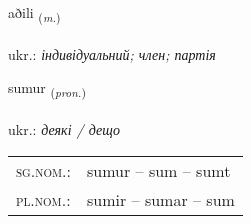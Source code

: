 \documentclass[frontgrid, backgrid]{flacards}\usepackage[]{graphicx}\usepackage[]{xcolor}
\begin{document}
\renewcommand{\blhead}{\vskip5pt {\small\bfseries\footnotesize Nafnorð | іменник }}
\renewcommand{\bcfoot}{\vskip5pt \hspace{2pt}{\small\bfseries\footnotesize 1K}}


{aðili \small{\textsubscript{(\textit{m.})}} \\[1ex] %
\textphonetic{[aːðɪlɪ]} \\
ukr.: \emph{індивідуальний; член; партія} \\  [2ex]
\renewcommand*{\arraystretch}{0.8}
}

\renewcommand{\flhead}{\vskip5pt \fboxsep=0pt {\small\bfseries\footnotesize Fornafn | займенник}}
\renewcommand{\fcfoot}{\vskip5pt \fboxsep=0pt \hspace{2pt}{\small\bfseries\footnotesize 1K}}

\renewcommand{\blhead}{\vskip5pt {\small\bfseries\footnotesize Fornafn | займенник }}
\renewcommand{\bcfoot}{\vskip5pt \hspace{2pt}{\small\bfseries\footnotesize 1K}}


{sumur \small{\textsubscript{(\textit{pron.})}} \\[1ex] %
\textphonetic{[sʏːmʏr]} \\
ukr.: \emph{деякі / дещо} \\  [2ex]
\renewcommand*{\arraystretch}{0.8}
\begin{tabular}{ll}
\textsc{sg.nom.}: & sumur  --  sum -- sumt \\ 
\textsc{pl.nom.}: & sumir -- sumar -- sum
\end{tabular}
}

\renewcommand{\flhead}{\vskip5pt \fboxsep=0pt {\small\bfseries\footnotesize Sagnorð | дієслово}}
\renewcommand{\fcfoot}{\vskip5pt \fboxsep=0pt \hspace{2pt}{\small\bfseries\footnotesize 1K}}
\end{document}
